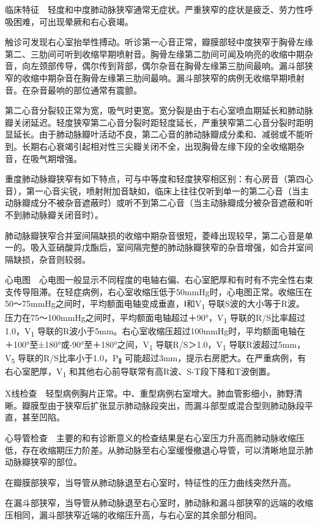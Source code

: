 临床特征　轻度和中度肺动脉狭窄通常无症状。严重狭窄的症状是疲乏、劳力性呼吸困难，可出现晕厥和右心衰竭。

触诊可发现右心室抬举性搏动。听诊第一心音正常，瓣膜部轻中度狭窄于胸骨左缘第二、三肋间可听到收缩早期喷射音。胸骨左缘第二肋间可闻及响亮的收缩中期杂音，向左颈部传导，偶尔传到背部，偶尔杂音在胸骨左缘第三肋间最响。漏斗部狭窄的收缩中期杂音在胸骨左缘第三肋间最响。漏斗部狭窄的病例无收缩早期喷射音。在杂音最响的部位通常有震颤。

第二心音分裂较正常为宽，吸气时更宽。宽分裂是由于右心室喷血期延长和肺动脉瓣关闭延迟。轻度狭窄第二心音分裂时距轻度延长，严重狭窄第二心音分裂时距明显延长。由于肺动脉瓣叶活动不良，第二心音的肺动脉瓣成分柔和、减弱或不能听到。长期右心衰竭引起相对性三尖瓣关闭不全，出现胸骨左缘下段的全收缩期杂音，在吸气期增强。

重度肺动脉瓣狭窄有如下特点，可与中等度和轻度狭窄相区别：有心房音（第四心音），第一心音尖锐，喷射附加音缺如，临床上往往仅听到单一的第二心音（当主动脉瓣成分不被杂音遮蔽时）或听不到第二心音（当主动脉瓣成分被杂音遮蔽和听不到肺动脉瓣关闭音时）。

肺动脉瓣狭窄合并室间隔缺损的收缩中期杂音很短，菱峰出现较早，第二心音是单一的。吸入亚硝酸异戊酯后，室间隔完整的肺动脉瓣狭窄的杂音增强，如合并室间隔缺损，杂音则较弱。

心电图　心电图一般显示不同程度的电轴右偏、右心室肥厚和有时有不完全性右束支传导阻滞。在轻症病例，右心室收缩压低于50mmHg时，心电图正常。收缩压在50～75mmHg之间时，平均额面电轴变成垂直，Ⅰ和V\textsubscript{1}
导联S波的大小等于R波。压力在75～100mmHg之间时，平均额面电轴超过＋90°，V\textsubscript{1}
导联的R/S比率超过1.0，V\textsubscript{1}
导联的R波小于5mm。右心室收缩压超过100mmHg时，平均额面电轴在＋100°至±180°或-90°至＋180°之间，V\textsubscript{1}
导联R/S＞1.0，V\textsubscript{1} 导联R波超过5mm，V\textsubscript{5}
导联的R/S比率小于1.0，P\textsubscript{Ⅱ}
可能超过3mm，提示右房肥大。在严重病例，有右心室肥厚，V\textsubscript{1}
和其他右心前导联常有高R波、S-T段下降和T波倒置。

X线检查　轻型病例胸片正常。中、重型病例右室增大。肺血管影细小，肺野清晰。瓣膜型由于狭窄后扩张显示肺动脉段突出，而漏斗部型或混合型则肺动脉段平直，甚至凹陷。

心导管检查　主要的和有诊断意义的检查结果是右心室压力升高而肺动脉收缩压低，存在收缩期压力阶差。从肺动脉至右心室缓慢撤退心导管，可以清晰地显示肺动脉瓣狭窄的部位。

在瓣膜部狭窄，当导管从肺动脉退至右心室时，特征性的压力曲线突然升高。

在漏斗部狭窄，当导管从肺动脉退至右心室时，肺动脉和漏斗部狭窄的远端的收缩压相同，漏斗部狭窄近端的收缩压升高，与右心室的其余部分相同。

